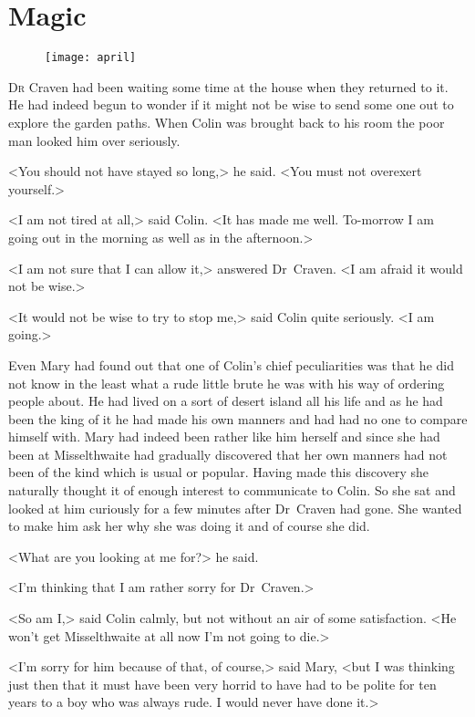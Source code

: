 \chapter{Magic} 
	
\begin{figure}[t!]
\centering
\texttt{[image: april]}
\end{figure}

	\lettrine[]{D}{r} Craven had been waiting some time at the house when they returned to it. He had indeed begun to wonder if it might not be wise to send some one out to explore the garden paths. When Colin was brought back to his room the poor man looked him over seriously.

\zz
<You should not have stayed so long,> he said. <You must not overexert yourself.>

<I am not tired at all,> said Colin. <It has made me well. To-morrow I am going out in the morning as well as in the afternoon.>

<I am not sure that I can allow it,> answered Dr~Craven. <I am afraid it would not be wise.>

<It would not be wise to try to stop me,> said Colin quite seriously. <I am going.>

Even Mary had found out that one of Colin's chief peculiarities was that he did not know in the least what a rude little brute he was with his way of ordering people about. He had lived on a sort of desert island all his life and as he had been the king of it he had made his own manners and had had no one to compare himself with. Mary had indeed been rather like him herself and since she had been at Misselthwaite had gradually discovered that her own manners had not been of the kind which is usual or popular. Having made this discovery she naturally thought it of enough interest to communicate to Colin. So she sat and looked at him curiously for a few minutes after Dr~Craven had gone. She wanted to make him ask her why she was doing it and of course she did.

<What are you looking at me for?> he said.

<I'm thinking that I am rather sorry for Dr~Craven.>

<So am I,> said Colin calmly, but not without an air of some satisfaction. <He won't get Misselthwaite at all now I'm not going to die.>

<I'm sorry for him because of that, of course,> said Mary, <but I was thinking just then that it must have been very horrid to have had to be polite for ten years to a boy who was always rude. I would never have done it.>

